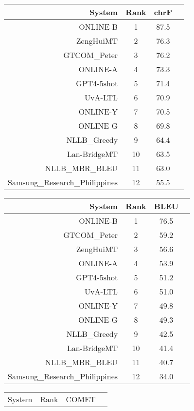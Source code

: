 \documentclass[11pt]{article}
\begin{document}
\begin{table}  
\scriptsize\begin{subtable}[t]{0.33\textwidth}
\begin{tabular}{rccc}
\toprule 
System & Rank & chrF \\ 
\midrule 
ONLINE-B & 1 & 87.5 \\ 
ZengHuiMT & 2 & 76.3 \\ 
GTCOM\_Peter & 3 & 76.2 \\ 
ONLINE-A & 4 & 73.3 \\ 
GPT4-5shot & 5 & 71.4 \\ 
UvA-LTL & 6 & 70.9 \\ 
ONLINE-Y & 7 & 70.5 \\ 
ONLINE-G & 8 & 69.8 \\ 
NLLB\_Greedy & 9 & 64.4 \\ 
Lan-BridgeMT & 10 & 63.5 \\ 
NLLB\_MBR\_BLEU & 11 & 63.0 \\ 
Samsung\_Research\_Philippines & 12 & 55.5 \\ 
\bottomrule 
\end{tabular} 
\end{subtable} 
\begin{subtable}[t]{0.33\textwidth}
\begin{tabular}{rccc}
\toprule 
System & Rank & BLEU \\ 
\midrule 
ONLINE-B & 1 & 76.5 \\ 
GTCOM\_Peter & 2 & 59.2 \\ 
ZengHuiMT & 3 & 56.6 \\ 
ONLINE-A & 4 & 53.9 \\ 
GPT4-5shot & 5 & 51.2 \\ 
UvA-LTL & 6 & 51.0 \\ 
ONLINE-Y & 7 & 49.8 \\ 
ONLINE-G & 8 & 49.3 \\ 
NLLB\_Greedy & 9 & 42.5 \\ 
Lan-BridgeMT & 10 & 41.4 \\ 
NLLB\_MBR\_BLEU & 11 & 40.7 \\ 
Samsung\_Research\_Philippines & 12 & 34.0 \\ 
\bottomrule 
\end{tabular} 
\end{subtable} 
\begin{subtable}[t]{0.33\textwidth}
\begin{tabular}{rccc}
\toprule 
System & Rank & COMET \\ 

\end{tabular}
\end{subtable}
\end{table}
\end{document}
